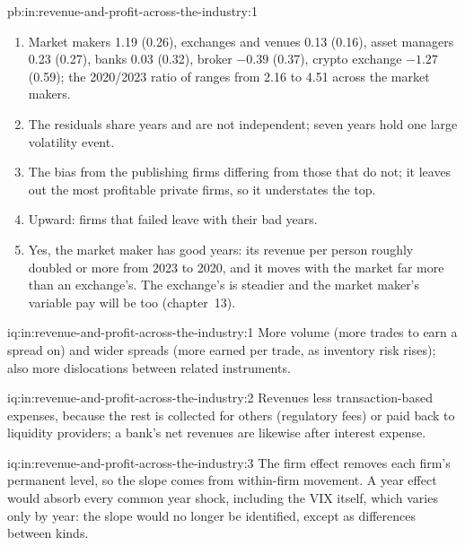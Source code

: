 \begin{solution}{pb:in:revenue-and-profit-across-the-industry:1}
\begin{enumerate}
\item Market makers 1.19 (0.26), exchanges and venues 0.13 (0.16), asset managers 0.23 (0.27), banks 0.03 (0.32),
broker $-0.39$ (0.37), crypto exchange $-1.27$ (0.59); the 2020/2023 ratio of  ranges from 2.16 to 4.51
across the market makers.
\item The residuals share years and are not independent; seven years hold one large volatility event.
\item The bias from the publishing firms differing from those that do not; it leaves out the most profitable private
firms, so it understates the top.
\item Upward: firms that failed leave with their bad years.
\item Yes, the market maker has good years: its revenue per person roughly doubled or more from 2023 to 2020, and it moves
with the market far more than an exchange's. The exchange's is steadier and the market maker's variable pay will be too
(chapter~13).
\end{enumerate}
\end{solution}

\begin{solution}{iq:in:revenue-and-profit-across-the-industry:1}
More volume (more trades to earn a spread on) and wider spreads (more earned per trade, as inventory risk rises); also
more dislocations between related instruments.
\end{solution}

\begin{solution}{iq:in:revenue-and-profit-across-the-industry:2}
Revenues less transaction-based expenses, because the rest is collected for others (regulatory fees) or paid back to
liquidity providers; a bank's net revenues are likewise after interest expense.
\end{solution}

\begin{solution}{iq:in:revenue-and-profit-across-the-industry:3}
The firm effect removes each firm's permanent level, so the slope comes from within-firm movement. A year effect would
absorb every common year shock, including the VIX itself, which varies only by year: the slope would no longer be
identified, except as differences between kinds.
\end{solution}

